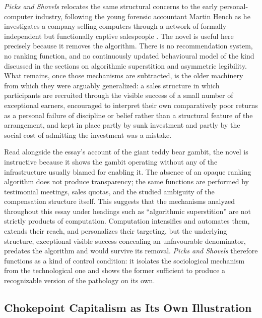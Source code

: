 \documentclass[11pt]{article}
\begin{document}
\emph{Picks and Shovels} relocates the same structural concerns to the early personal-computer industry, following the young forensic accountant Martin Hench as he investigates a company selling computers through a network of formally independent but functionally captive salespeople \citep{doctorow2025picksandshovels}. The novel is useful here precisely because it removes the algorithm. There is no recommendation system, no ranking function, and no continuously updated behavioural model of the kind discussed in the sections on algorithmic superstition and asymmetric legibility. What remains, once those mechanisms are subtracted, is the older machinery from which they were arguably generalized: a sales structure in which participants are recruited through the visible success of a small number of exceptional earners, encouraged to interpret their own comparatively poor returns as a personal failure of discipline or belief rather than a structural feature of the arrangement, and kept in place partly by sunk investment and partly by the social cost of admitting the investment was a mistake.

Read alongside the essay's account of the giant teddy bear gambit, the novel is instructive because it shows the gambit operating without any of the infrastructure usually blamed for enabling it. The absence of an opaque ranking algorithm does not produce transparency; the same functions are performed by testimonial meetings, sales quotas, and the studied ambiguity of the compensation structure itself. This suggests that the mechanisms analyzed throughout this essay under headings such as ``algorithmic superstition'' are not strictly products of computation. Computation intensifies and automates them, extends their reach, and personalizes their targeting, but the underlying structure, exceptional visible success concealing an unfavourable denominator, predates the algorithm and would survive its removal. \emph{Picks and Shovels} therefore functions as a kind of control condition: it isolates the sociological mechanism from the technological one and shows the former sufficient to produce a recognizable version of the pathology on its own.

\subsection{Chokepoint Capitalism as Its Own Illustration}
\end{document}
